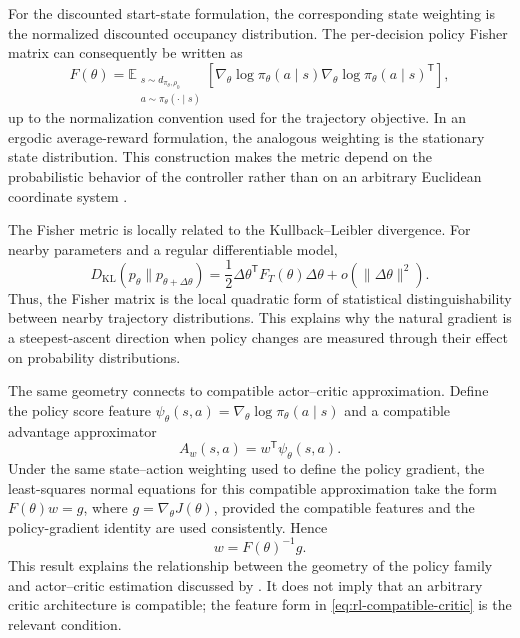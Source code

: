 For the discounted start-state formulation, the corresponding state weighting
is the normalized discounted occupancy distribution. The per-decision policy
Fisher matrix can consequently be written as
\begin{equation}
    F(\theta)
    =\mathbb{E}_{\substack{s\sim d_{\pi_\theta,\rho_0}\\
                            a\sim\pi_\theta(\cdot\mid s)}}
      \left[
      \nabla_\theta\log\pi_\theta(a\mid s)
      \nabla_\theta\log\pi_\theta(a\mid s)^{\mathsf T}
      \right],
    \label{eq:rl-occupancy-fisher}
\end{equation}
up to the normalization convention used for the trajectory objective. In an
ergodic average-reward formulation, the analogous weighting is the stationary
state distribution. This construction makes the metric depend on the
probabilistic behavior of the controller rather than on an arbitrary Euclidean
coordinate system \parencite{bagnell2003covariant}.

The Fisher metric is locally related to the Kullback--Leibler divergence. For
nearby parameters and a regular differentiable model,
\begin{equation}
    D_{\mathrm{KL}}(p_\theta\|p_{\theta+\Delta\theta})
    =\frac{1}{2}\Delta\theta^{\mathsf T}F_T(\theta)
      \Delta\theta+o(\|\Delta\theta\|^2).
    \label{eq:rl-fisher-kl-expansion}
\end{equation}
Thus, the Fisher matrix is the local quadratic form of statistical
 distinguishability between nearby trajectory distributions. This explains why
the natural gradient is a steepest-ascent direction when policy changes are
measured through their effect on probability distributions.

The same geometry connects to compatible actor--critic approximation. Define
the policy score feature
$\psi_\theta(s,a)=\nabla_\theta\log\pi_\theta(a\mid s)$ and a compatible
advantage approximator
\begin{equation}
    A_w(s,a)=w^{\mathsf T}\psi_\theta(s,a).
    \label{eq:rl-compatible-critic}
\end{equation}
Under the same state--action weighting used to define the policy gradient,
the least-squares normal equations for this compatible approximation take the
form $F(\theta)w=g$, where $g=\nabla_\theta J(\theta)$, provided the compatible
features and the policy-gradient identity are used consistently. Hence
\begin{equation}
    w=F(\theta)^{-1}g.
    \label{eq:rl-compatible-natural-gradient}
\end{equation}
This result explains the relationship between the geometry of the policy
family and actor--critic estimation discussed by \textcite{bagnell2003covariant}.
It does not imply that an arbitrary critic architecture is compatible; the
feature form in \cref{eq:rl-compatible-critic} is the relevant condition.

